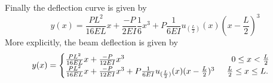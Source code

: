 Finally the deflection curve is given by
\begin{equation}
y(x)=\frac{PL^2}{16EL}x+\frac{-P}{2EI}\frac{1}{6}x^{3}+P\frac{1}{6EI}u_{(\frac{L}{2})}(x)(x-\frac{L}{2})^{3}
\end{equation}
More explicitly, the beam deflection is given by
\begin{align*}
  y(x) = \begin{cases}
  \frac{PL^2}{16EL}x+\frac{-P}{12EI}x^{3}\hspace{4.5cm}  0\leq x<\frac{L}{2} \\
  \frac{PL^2}{16EL}x+\frac{-P}{12EI}x^{3}+P\frac{1}{6EI}u_{(\frac{L}{2})}(x)(x-\frac{L}{2})^{3}\hspace{0.5cm}  \frac{L}{2}\leq x\leq L.
  \end{cases}
 \end{align*}
